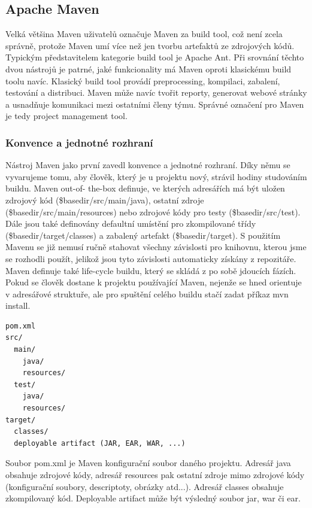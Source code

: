 \documentclass[11pt,twoside,a4paper]{book}
\begin{document}
\subsection{Apache Maven}

Velká většina Maven uživatelů označuje Maven za build tool, což není zcela správně, protože
Maven umí více než jen tvorbu artefaktů ze zdrojových kódů. Typickým představitelem
kategorie build tool je Apache Ant. Při srovnání těchto dvou nástrojů je patrné, jaké
funkcionality má Maven oproti klasickému build toolu navíc. Klasický build tool provádí
preprocessing, kompilaci, zabalení, testování a distribuci. Maven může navíc tvořit reporty,
generovat webové stránky a usnadňuje komunikaci mezi ostatními členy týmu. Správné
označení pro Maven je tedy project management tool.

\subsubsection{Konvence a jednotné rozhraní}

Nástroj Maven jako první zavedl konvence a jednotné rozhraní. Díky němu se vyvarujeme
tomu, aby člověk, který je u projektu nový, strávil hodiny studováním buildu. Maven out-of-
the-box definuje, ve kterých adresářích má být uložen zdrojový kód
(\${basedir}/src/main/java), ostatní zdroje (\${basedir}/src/main/resources)
nebo zdrojové kódy pro testy (\${basedir}/src/test). Dále jsou také definovány
defaultní umístění pro zkompilované třídy (\${basedir}/target/classes) a zabalený artefakt
(\${basedir}/target). S použitím Mavenu se již nemusí ručně stahovat všechny
závislosti pro knihovnu, kterou jsme se rozhodli použít, jelikož jsou tyto závislosti automaticky získány z repozitáře. Maven
definuje také life-cycle buildu, který se skládá z po sobě jdoucích fázích. Pokud se člověk
dostane k projektu používající Maven, nejenže se hned orientuje v adresářové struktuře, ale
pro spuštění celého buildu stačí zadat příkaz mvn install.

\begin{lstlisting}[frame=single]
pom.xml
src/
  main/
    java/
    resources/
  test/
    java/
    resources/
target/
  classes/
  deployable artifact (JAR, EAR, WAR, ...)
\end{lstlisting}

Soubor pom.xml je Maven konfigurační soubor daného projektu. Adresář java obsahuje
zdrojové kódy, adresář resources pak ostatní zdroje mimo zdrojové kódy (konfigurační
soubory, descriptoty, obrázky atd...). Adresář classes obsahuje zkompilovaný kód. Deployable
artifact může být výsledný soubor jar, war či ear.
\end{document}
